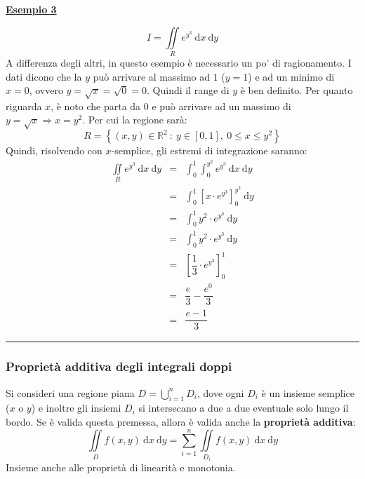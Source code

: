 \documentclass[a4paper]{article}
\newcommand{\longline}{\noindent\rule{\textwidth}{0.4pt}}
\newcommand{\example}[1]{\textcolor{Green4}{\textbf{#1}}}
\begin{document}
	\newpage

	\begin{flushleft}
		\example{\underline{Esempio 3}}
	\end{flushleft}
	\begin{equation*}
		I = \iint \limits_{R} e^{y^{3}} \:\mathrm{d}x \:\mathrm{d}y
	\end{equation*}
	A differenza degli altri, in questo esempio è necessario un po' di ragionamento. I dati dicono che la $y$ può arrivare al massimo ad $1$ ($y = 1$) e ad un minimo di $x=0$, ovvero $y=\sqrt{x}=\sqrt{0}=0$. Quindi il range di $y$ è ben definito. Per quanto riguarda $x$, è noto che parta da $0$ e può arrivare ad un massimo di $y = \sqrt{x} \Rightarrow x = y^{2}$. Per cui la regione sarà:
	\begin{equation*}
		R = \left\{\left(x,y\right) \in \mathbb{R}^{2} \: : \: y \in \left[0,1\right], \: 0 \le x \le y^{2}\right\}
	\end{equation*}
	Quindi, risolvendo con $x$-semplice, gli estremi di integrazione saranno:
	\begin{equation*}
		\begin{array}{rcl}
			\displaystyle \iint \limits_{R} e^{y^{3}} \:\mathrm{d}x \:\mathrm{d}y
			&=& 
			\displaystyle\int_{0}^{1} \int_{0}^{y^{2}} e^{y^{3}} \:\mathrm{d}x \:\mathrm{d}y \\ [1.5em]
			&=&
			\displaystyle\int_{0}^{1} \left[x \cdot e^{y^{3}}\right]_{0}^{y^{2}} \:\mathrm{d}y \\ [1.5em]
			&=&
			\displaystyle\int_{0}^{1} y^{2} \cdot e^{y^{3}} \:\mathrm{d}y \\ [1.5em]
			&=&
			\displaystyle\int_{0}^{1} y^{2} \cdot e^{y^{3}} \:\mathrm{d}y \\ [1.5em]
			&=&
			\left[\dfrac{1}{3} \cdot e^{y^{3}}\right]_{0}^{1} \\ [1.5em]
			&=&
			\dfrac{e}{3} - \dfrac{e^{0}}{3} \\ [1.5em]
			&=&
			\dfrac{e - 1}{3}
		\end{array}
	\end{equation*}
	
	\longline

	\subsubsection{Proprietà additiva degli integrali doppi}\label{subsubsection: proprietà additiva degli integrali doppi}

	Si consideri una regione piana $D = \bigcup_{i=1}^{n} D_{i}$, dove ogni $D_{i}$ è un insieme semplice ($x$ o $y$) e inoltre gli insiemi $D_{i}$ si intersecano a due a due eventuale solo lungo il bordo. Se è valida questa premessa, allora è valida anche la \textbf{proprietà additiva}:
	\begin{equation*}
		\displaystyle \iint \limits_{D} f\left(x,y\right) \:\mathrm{d}x \: \mathrm{d}y = \displaystyle \sum_{i=1}^{n} \iint \limits_{D_{i}} f\left(x,y\right) \:\mathrm{d}x \: \mathrm{d}y
	\end{equation*}
	Insieme anche alle proprietà di linearità e monotonia.
\end{document}
